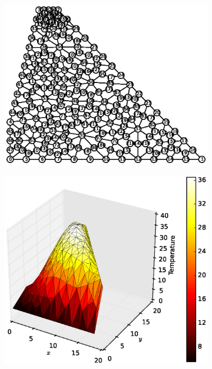 \documentclass[10pt, a4paper]{article}
\begin{document}
\begin{figure}[H]
\centering
	\begin{subfigure}[H]{0.3\textwidth}
		\includegraphics[width=1.2\textwidth]{fig/exdam4_1.eps}
		\caption{}
		\label{fig:1}
	\end{subfigure}
	\begin{subfigure}[H]{0.33\textwidth}
		\includegraphics[width=\textwidth]{fig/exdam4_2.eps}
		\caption{}
		\label{fig:2}
	\end{subfigure}

\end{figure}
\end{document}

